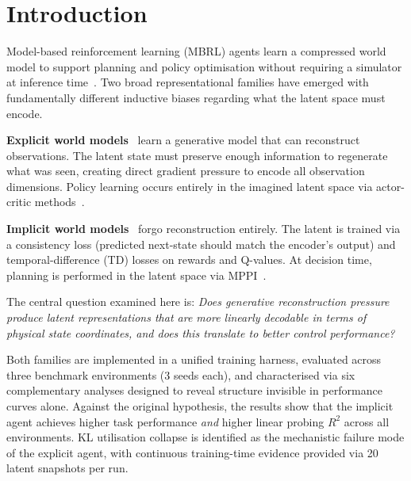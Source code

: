 \documentclass{article}
\begin{document}
\section{Introduction}
\label{sec:intro}

Model-based reinforcement learning (MBRL) agents learn a compressed world model to
support planning and policy optimisation without requiring a simulator at inference
time~\citep{hafner2020dreamer,hansen2022tdmpc}.
Two broad representational families have emerged with fundamentally different inductive
biases regarding what the latent space must encode.

\textbf{Explicit world models}~\citep{hafner2021dreamerv2,hafner2023dreamerv3} learn a
generative model that can reconstruct observations.
The latent state must preserve enough information to regenerate what was seen, creating
direct gradient pressure to encode all observation dimensions.
Policy learning occurs entirely in the imagined latent space via actor-critic
methods~\citep{schulman2015gae}.

\textbf{Implicit world models}~\citep{hansen2022tdmpc,hansen2024tdmpc2} forgo
reconstruction entirely.
The latent is trained via a consistency loss (predicted next-state should match the
encoder's output) and temporal-difference (TD) losses on rewards and Q-values.
At decision time, planning is performed in the latent space via
MPPI~\citep{williams2017mppi}.

The central question examined here is:
\textit{Does generative reconstruction pressure produce latent representations that are
more linearly decodable in terms of physical state coordinates, and does this translate
to better control performance?}

Both families are implemented in a unified training harness, evaluated across three
benchmark environments (3 seeds each), and characterised via six complementary analyses
designed to reveal structure invisible in performance curves alone.
Against the original hypothesis, the results show that the implicit agent achieves
higher task performance \emph{and} higher linear probing $R^2$ across all environments.
KL utilisation collapse is identified as the mechanistic failure mode of the explicit
agent, with continuous training-time evidence provided via 20 latent snapshots per run.

\end{document}
